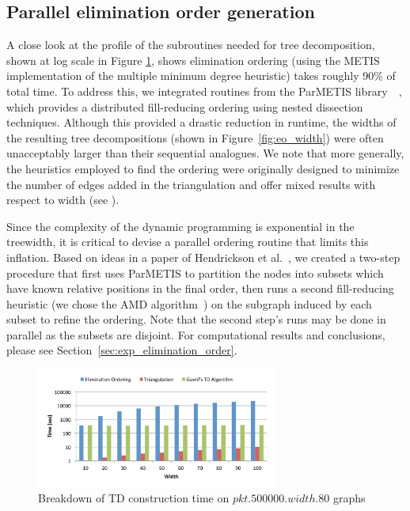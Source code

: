 \documentclass[conference]{IEEEtran}
\begin{document}
\subsection{Parallel elimination order generation}\label{sec:elimination_order}

A close look at the profile of the subroutines needed for tree decomposition, shown at log scale in Figure \ref{fig:pkt.td}, shows elimination ordering (using the METIS implementation of the multiple minimum degree heuristic) takes roughly 90\% of
total time. To address this, we integrated routines from the
ParMETIS library~\cite{Karypis1996parallel}~\cite{Karypis1997parmetis},%
 which provides a distributed fill-reducing ordering using nested dissection techniques. Although this provided
a drastic reduction in runtime, the widths of the resulting tree decompositions (shown in Figure~\ref{fig:eo_width})
were often unacceptably larger than their sequential analogues. We note that more generally, the heuristics
employed to find the ordering were originally designed to minimize the number of edges added
in the triangulation and offer mixed results with respect to width (see \cite{serialTM}).

Since the complexity of the dynamic programming
is exponential in the treewidth, it is critical to devise a parallel ordering routine that limits this
inflation. Based on ideas in a paper of Hendrickson et al.~\cite{HendricksonEO},
we created a two-step procedure that first uses ParMETIS to partition the nodes into subsets which have known
relative positions in the final order, then runs a second fill-reducing heuristic (we chose the AMD algorithm~\cite{Amestoy2004algorithm}) on the subgraph induced by each subset  to refine the ordering. Note that the second step's runs may be done in parallel as the subsets are disjoint. For computational results and conclusions, please see Section~\ref{sec:exp_elimination_order}.

\begin{figure}[ht]
\includegraphics[angle=0,width=3.1in]{figures/fig3_col.pdf}
\caption{Breakdown of TD construction time on $pkt.500000.width.80$ graphs}
\label{fig:pkt.td}
\end{figure}
\end{document}
